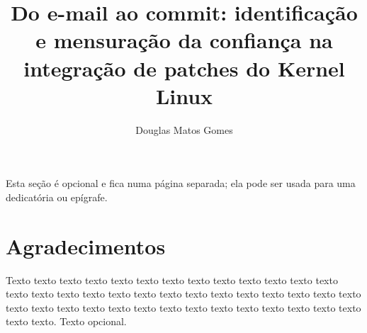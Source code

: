 \documentclass[a4paper,12pt,twoside,english,brazilian]{book}
\title{Do e-mail ao commit: identificação e mensuração da confiança na integração de patches do Kernel Linux}[]
\author[masc]{Douglas Matos Gomes}
\begin{document}

\frontmatter

\pagestyle{plain}

\onehalfspacing %

\maketitle %


\begin{dedicatoria}
Esta seção é opcional e fica numa página separada; ela pode ser usada para
uma dedicatória ou epígrafe.
\end{dedicatoria}


\chapter*{Agradecimentos}

Texto texto texto texto texto texto texto texto texto texto texto texto texto
texto texto texto texto texto texto texto texto texto texto texto texto texto
texto texto texto texto texto texto texto texto texto texto texto texto texto
texto texto texto texto. Texto opcional.




\end{document}

